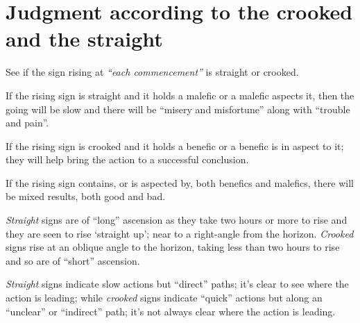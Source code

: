 \section{Judgment according to the crooked and the straight}
See if the sign rising at \textsl{``each commencement''} is straight or crooked.

If the rising sign is straight and it holds a malefic or a malefic aspects it, then the going will be slow and there will be ``misery and misfortune'' along with ``trouble and pain''.

If the rising sign is crooked and it holds a benefic or a benefic is in aspect to it; they will help bring the action to a successful conclusion.

If the rising sign contains, or is aspected by, both benefics and malefics, there will be mixed results, both good and bad.

\begin{mdframed}[backgroundcolor=cyan!5, rightmargin=1em, leftmargin=1em]
\textsl{Straight} signs are of ``long'' ascension as they take two hours or more to rise and they are seen to rise `straight up'; near to a right-angle from the horizon. \textsl{Crooked} signs rise at an oblique angle to the horizon, taking less than two hours to rise and so are of ``short'' ascension.

\textsl{Straight} signs indicate slow actions but ``direct'' paths; it's clear to see where the action is leading; while \textsl{crooked} signs indicate ``quick'' actions but along an ``unclear'' or ``indirect'' path; it's not always clear where the action is leading.
\end{mdframed}
